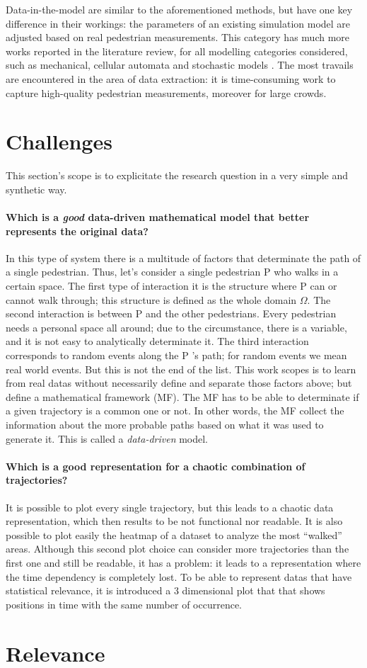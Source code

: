 \documentclass[class=article, crop=false]{standalone}
\begin{document}
Data-in-the-model are similar to the aforementioned methods, but have one key difference in their workings: the parameters of an existing simulation model are adjusted based on real pedestrian measurements. This category has much more works reported in the literature review, for all modelling categories considered, such as mechanical, cellular automata and stochastic models \cite{crowd_simulation,interactive_crowd_simulation,data_driven_simulation}. The most travails are encountered in the area of data extraction: it is time-consuming work to capture high-quality pedestrian measurements, moreover for large crowds.



\section{Challenges}
This section's scope is to explicitate the research question in a very simple and synthetic way.

\paragraph{Which is a \emph{good} data-driven mathematical model that better represents the original data?}
In this type of system there is a multitude of factors that determinate the path of a single pedestrian. 
Thus, let’s consider a single pedestrian P who walks in a certain space. 
The first type of interaction it is the structure where P can or cannot walk through; this structure is defined as the whole domain $\Omega$. 
The second interaction is between P and the other pedestrians. 
Every pedestrian needs a personal space all around; due to the circumstance, there is a variable, and it is not easy to analytically determinate it.
The third interaction corresponds to random events along the P ’s path; for random events we mean real world events.
But this is not the end of the list.
This work scopes is to learn from real datas without necessarily define and separate those factors above; but define a mathematical framework (MF).
The MF has to be able to determinate if a given trajectory is a common one or not. 
In other words, the MF collect the information about the more probable paths based on what it was used to generate it.
This is called a \emph{data-driven} model.


\paragraph{Which is a good representation for a chaotic combination of trajectories?}
It is possible to plot every single trajectory, but this leads to a chaotic data representation, which then results to be not functional nor readable. 
It is also possible to plot easily the heatmap of a dataset to analyze the most “walked” areas. 
Although this second plot choice can consider more trajectories than the first one and still be readable, it has a problem: it leads to a representation where the time dependency is completely lost.
To be able to represent datas that have statistical relevance, it is introduced a 3 dimensional plot that that shows positions in time with the same number of occurrence.



\section{Relevance}
\end{document}
